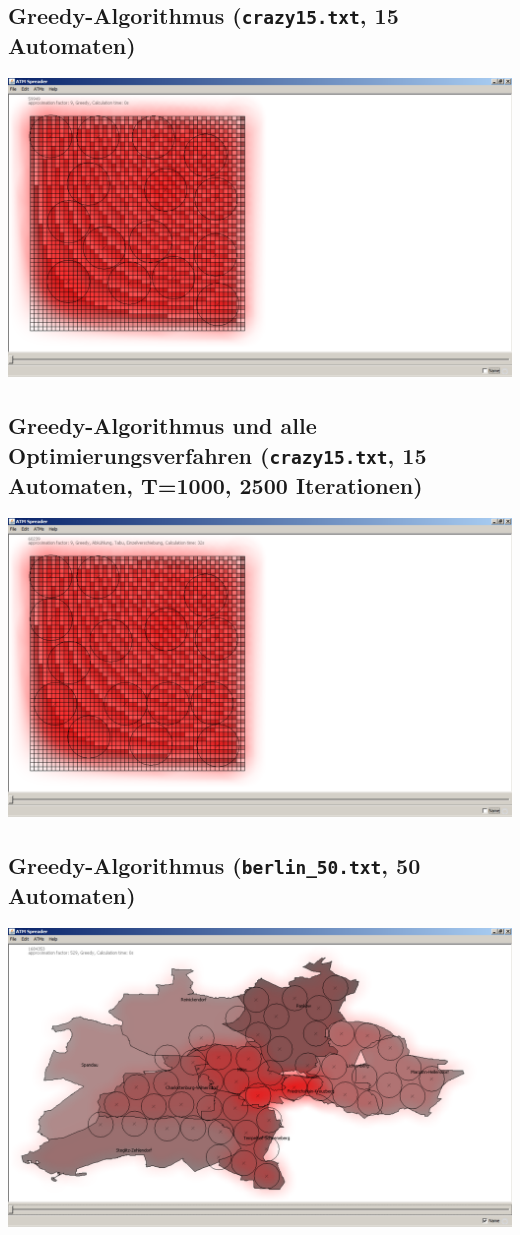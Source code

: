 \documentclass[12pt,a4paper]{article}
\begin{document}
\subsection{Greedy-Algorithmus (\texttt{crazy15.txt}, 15 Automaten)}
\includegraphics[width=1.0\textwidth]{crazy15.pdf}

\subsection{Greedy-Algorithmus und alle Optimierungsverfahren (\texttt{crazy15.txt}, 15 Automaten, T=1000, 2500 Iterationen)}
\includegraphics[width=1.0\textwidth]{crazy15_alles.pdf}

\subsection{Greedy-Algorithmus (\texttt{berlin\_50.txt}, 50 Automaten)}
\includegraphics[width=1.0\textwidth]{berlin50_greedy.pdf}
\end{document}
